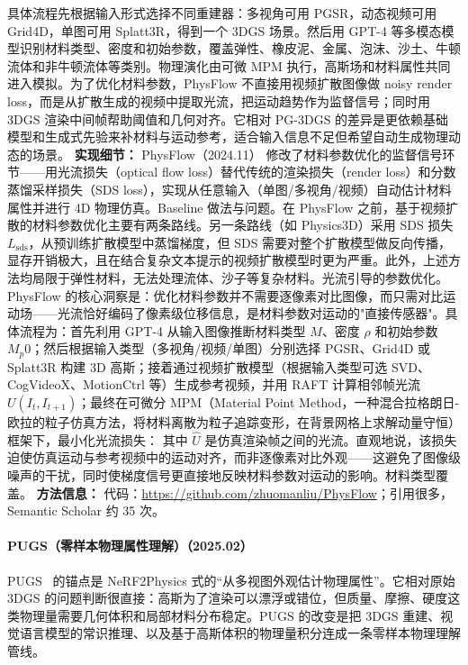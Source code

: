 具体流程先根据输入形式选择不同重建器：多视角可用 PGSR，动态视频可用 Grid4D，单图可用 Splatt3R，得到一个 3DGS 场景。然后用 GPT-4 等多模态模型识别材料类型、密度和初始参数，覆盖弹性、橡皮泥、金属、泡沫、沙土、牛顿流体和非牛顿流体等类别。物理演化由可微 MPM 执行，高斯场和材料属性共同进入模拟。为了优化材料参数，PhysFlow 不直接用视频扩散图像做 noisy render loss，而是从扩散生成的视频中提取光流，把运动趋势作为监督信号；同时用 3DGS 渲染中间帧帮助阈值和几何对齐。它相对 PG-3DGS 的差异是更依赖基础模型和生成式先验来补材料与运动参考，适合输入信息不足但希望自动生成物理动态的场景。
\textbf{实现细节：} PhysFlow（2024.11） 修改了材料参数优化的监督信号环节——用光流损失（optical flow loss）替代传统的渲染损失（render loss）和分数蒸馏采样损失（SDS loss），实现从任意输入（单图/多视角/视频）自动估计材料属性并进行 4D 物理仿真。Baseline 做法与问题。在 PhysFlow 之前，基于视频扩散的材料参数优化主要有两条路线。另一条路线（如 Physics3D）采用 SDS 损失 $L_{\mathrm{sds}}$，从预训练扩散模型中蒸馏梯度，但 SDS 需要对整个扩散模型做反向传播，显存开销极大，且在结合复杂文本提示的视频扩散模型时更为严重。此外，上述方法均局限于弹性材料，无法处理流体、沙子等复杂材料。光流引导的参数优化。PhysFlow 的核心洞察是：优化材料参数并不需要逐像素对比图像，而只需对比运动场——光流恰好编码了像素级位移信息，是材料参数对运动的"直接传感器"。具体流程为：首先利用 GPT-4 从输入图像推断材料类型 $M$、密度 $\rho$ 和初始参数 $M_p^{}0$；然后根据输入类型（多视角/视频/单图）分别选择 PGSR、Grid4D 或 Splatt3R 构建 3D 高斯；接着通过视频扩散模型（根据输入类型可选 SVD、CogVideoX、MotionCtrl 等）生成参考视频，并用 RAFT 计算相邻帧光流 $U(I_t, I_{t+1})$；最终在可微分 MPM（Material Point Method，一种混合拉格朗日-欧拉的粒子仿真方法，将材料离散为粒子追踪变形，在背景网格上求解动量守恒）框架下，最小化光流损失： 其中 $\hat{U}$ 是仿真渲染帧之间的光流。直观地说，该损失迫使仿真运动与参考视频中的运动对齐，而非逐像素对比外观——这避免了图像级噪声的干扰，同时使梯度信号更直接地反映材料参数对运动的影响。材料类型覆盖。
\textbf{方法信息：} 代码：\url{https://github.com/zhuomanliu/PhysFlow}；引用很多，Semantic Scholar 约 35 次。



\paragraph{PUGS（零样本物理属性理解）（2025.02）}
PUGS~\cite{2502_12231} 的锚点是 NeRF2Physics 式的“从多视图外观估计物理属性”。它相对原始 3DGS 的问题判断很直接：高斯为了渲染可以漂浮或错位，但质量、摩擦、硬度这类物理量需要几何体积和局部材料分布稳定。PUGS 的改变是把 3DGS 重建、视觉语言模型的常识推理、以及基于高斯体积的物理量积分连成一条零样本物理理解管线。

